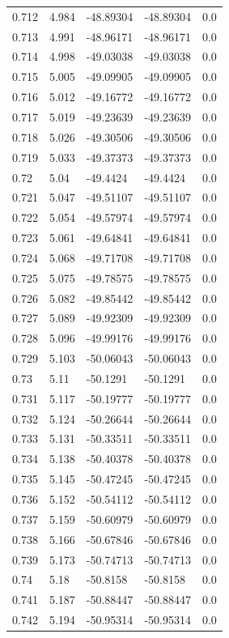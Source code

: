 \begin{tabular}{lllll}
0.712 & 4.984 & -48.89304 & -48.89304 & 0.0 \\
0.713 & 4.991 & -48.96171 & -48.96171 & 0.0 \\
0.714 & 4.998 & -49.03038 & -49.03038 & 0.0 \\
0.715 & 5.005 & -49.09905 & -49.09905 & 0.0 \\
0.716 & 5.012 & -49.16772 & -49.16772 & 0.0 \\
0.717 & 5.019 & -49.23639 & -49.23639 & 0.0 \\
0.718 & 5.026 & -49.30506 & -49.30506 & 0.0 \\
0.719 & 5.033 & -49.37373 & -49.37373 & 0.0 \\
0.72 & 5.04 & -49.4424 & -49.4424 & 0.0 \\
0.721 & 5.047 & -49.51107 & -49.51107 & 0.0 \\
0.722 & 5.054 & -49.57974 & -49.57974 & 0.0 \\
0.723 & 5.061 & -49.64841 & -49.64841 & 0.0 \\
0.724 & 5.068 & -49.71708 & -49.71708 & 0.0 \\
0.725 & 5.075 & -49.78575 & -49.78575 & 0.0 \\
0.726 & 5.082 & -49.85442 & -49.85442 & 0.0 \\
0.727 & 5.089 & -49.92309 & -49.92309 & 0.0 \\
0.728 & 5.096 & -49.99176 & -49.99176 & 0.0 \\
0.729 & 5.103 & -50.06043 & -50.06043 & 0.0 \\
0.73 & 5.11 & -50.1291 & -50.1291 & 0.0 \\
0.731 & 5.117 & -50.19777 & -50.19777 & 0.0 \\
0.732 & 5.124 & -50.26644 & -50.26644 & 0.0 \\
0.733 & 5.131 & -50.33511 & -50.33511 & 0.0 \\
0.734 & 5.138 & -50.40378 & -50.40378 & 0.0 \\
0.735 & 5.145 & -50.47245 & -50.47245 & 0.0 \\
0.736 & 5.152 & -50.54112 & -50.54112 & 0.0 \\
0.737 & 5.159 & -50.60979 & -50.60979 & 0.0 \\
0.738 & 5.166 & -50.67846 & -50.67846 & 0.0 \\
0.739 & 5.173 & -50.74713 & -50.74713 & 0.0 \\
0.74 & 5.18 & -50.8158 & -50.8158 & 0.0 \\
0.741 & 5.187 & -50.88447 & -50.88447 & 0.0 \\
0.742 & 5.194 & -50.95314 & -50.95314 & 0.0 \\

\end{tabular}
